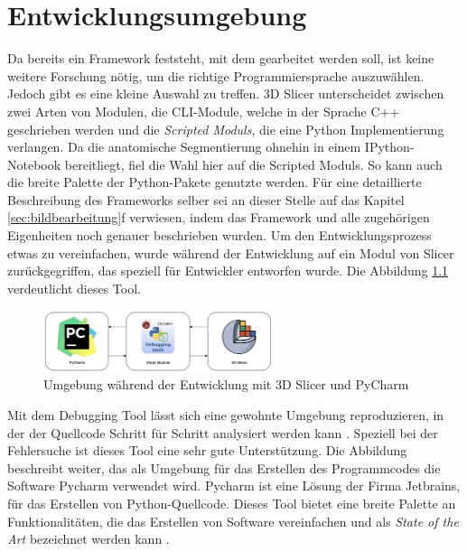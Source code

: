 \chapter{Entwicklungsumgebung}
\label{chap:entwicklungsumgebung} Da bereits ein Framework feststeht, mit dem
gearbeitet werden soll, ist keine weitere Forschung nötig, um die richtige
Programmiersprache auszuwählen. Jedoch gibt es eine kleine Auswahl zu treffen.
3D Slicer unterscheidet zwischen zwei Arten von Modulen, die \ac{CLI}-Module, welche
in der Sprache C++ geschrieben werden und die \textit{Scripted Moduls}, die eine
Python Implementierung verlangen. Da die anatomische Segmentierung ohnehin in
einem IPython-Notebook bereitliegt, fiel die Wahl hier auf die Scripted Moduls.
So kann auch die breite Palette der Python-Pakete genutzte werden. Für eine detaillierte
Beschreibung des Frameworks selber sei an dieser Stelle auf das Kapitel \ref{sec:bildbearbeitung}f
verwiesen, indem das Framework und alle zugehörigen Eigenheiten noch genauer beschrieben
wurden. Um den Entwicklungsprozess etwas zu vereinfachen, wurde während der Entwicklung
auf ein Modul von Slicer zurückgegriffen, das speziell für Entwickler entworfen
wurde. Die Abbildung \ref{fig:entwicklungsumgebung} verdeutlicht dieses Tool.

\begin{figure}[h]
	\centering
	\includegraphics[width=0.6\textwidth]{img/Entwicklungsumgebung.png}
	\caption{Umgebung während der Entwicklung mit 3D Slicer und PyCharm}
	\label{fig:entwicklungsumgebung}
\end{figure}

Mit dem Debugging Tool lässt sich eine gewohnte Umgebung reproduzieren, in der der
Quellcode Schritt für Schritt analysiert werden kann \citep[vgl.][]{slicerdebuggingtools}.
Speziell bei der Fehlersuche ist dieses Tool eine sehr gute Unterstützung. Die
Abbildung beschreibt weiter, das als Umgebung für das Erstellen des Programmcodes
die Software Pycharm verwendet wird. Pycharm ist eine Lösung der Firma Jetbrains,
für das Erstellen von Python-Quellcode. Dieses Tool bietet eine breite Palette
an Funktionalitäten, die das Erstellen von Software vereinfachen und als \textit{State
of the Art} bezeichnet werden kann \citep[vgl.][]{jetbrains2024}.

